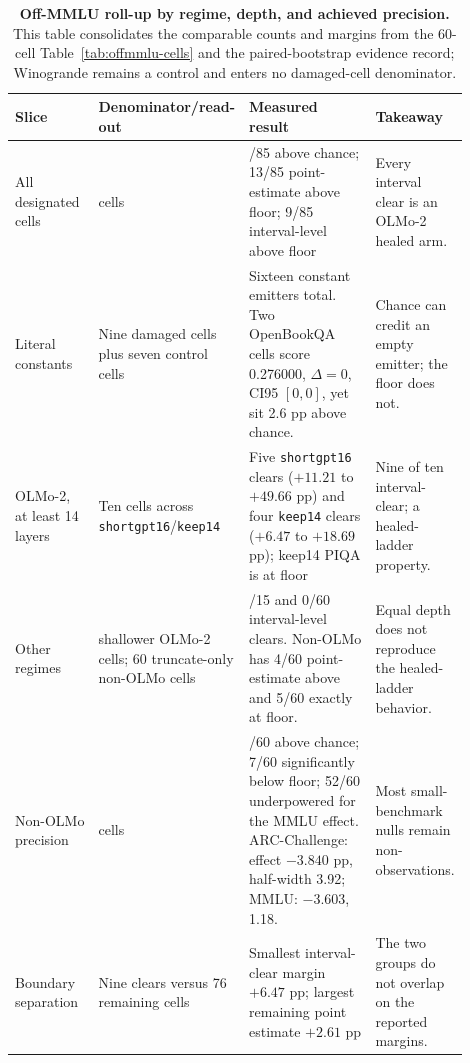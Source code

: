\begin{table}[!htbp]
\centering
\small
\setlength{\tabcolsep}{3.2pt}
\begin{tabular}{>{\raggedright\arraybackslash}p{0.19\linewidth}>{\raggedright\arraybackslash}p{0.20\linewidth}>{\raggedright\arraybackslash}p{0.31\linewidth}>{\raggedright\arraybackslash}p{0.20\linewidth}}
\toprule
Slice & Denominator/read-out & Measured result & Takeaway \\
\midrule
All designated cells & 85 cells & 45/85 above chance; 13/85 point-estimate above floor; 9/85 interval-level above floor & Every interval clear is an OLMo-2 healed arm. \\
Literal constants & Nine damaged cells plus seven control cells & Sixteen constant emitters total.  Two OpenBookQA cells score 0.276000, $\Delta=0$, CI95 $[0,0]$, yet sit 2.6 pp above chance. & Chance can credit an empty emitter; the floor does not. \\
OLMo-2, at least 14 layers & Ten cells across \texttt{shortgpt16}/\allowbreak\texttt{keep14} & Five \texttt{shortgpt16} clears ($+11.21$ to $+49.66$ pp) and four \texttt{keep14} clears ($+6.47$ to $+18.69$ pp); keep14 PIQA is at floor & Nine of ten interval-clear; a healed-ladder property. \\
Other regimes & 15 shallower OLMo-2 cells; 60 truncate-only non-OLMo cells & 0/15 and 0/60 interval-level clears.  Non-OLMo has 4/60 point-estimate above and 5/60 exactly at floor. & Equal depth does not reproduce the healed-ladder behavior. \\
Non-OLMo precision & 60 cells & 25/60 above chance; 7/60 significantly below floor; 52/60 underpowered for the MMLU effect.  ARC-Challenge: effect $-3.840$ pp, half-width 3.92; MMLU: $-3.603$, 1.18. & Most small-benchmark nulls remain non-observations. \\
Boundary separation & Nine clears versus 76 remaining cells & Smallest interval-clear margin $+6.47$ pp; largest remaining point estimate $+2.61$ pp & The two groups do not overlap on the reported margins. \\
\bottomrule
\end{tabular}
\caption{\textbf{Off-MMLU roll-up by regime, depth, and achieved precision.} This table consolidates the comparable counts and margins from the 60-cell Table~\ref{tab:offmmlu-cells} and the paired-bootstrap evidence record; Winogrande remains a control and enters no damaged-cell denominator.}
\label{tab:offmmlu-rollup}
\end{table}
